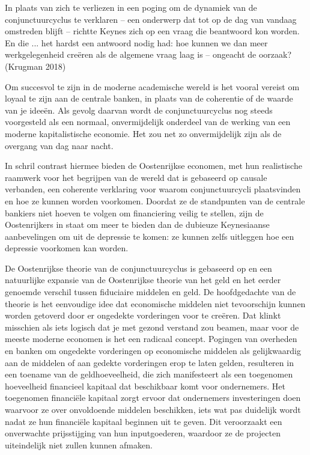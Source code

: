\documentclass[
  a5paper,
  smalldemyvopaper,11pt,twoside,onecolumn,openright,extrafontsizes,
hidelinks]{memoir}
\begin{document}
In plaats van zich te verliezen in een poging om de dynamiek van de
conjunctuurcyclus te verklaren -- een onderwerp dat tot op de dag van
vandaag omstreden blijft -- richtte Keynes zich op een vraag die
beantwoord kon worden. En die ... het hardst een antwoord nodig had: hoe
kunnen we dan meer werkgelegenheid creëren als de algemene vraag laag is
-- ongeacht de oorzaak? (Krugman 2018)

Om succesvol te zijn in de moderne academische wereld is het vooral
vereist om loyaal te zijn aan de centrale banken, in plaats van de
coherentie of de waarde van je ideeën. Als gevolg daarvan wordt de
conjunctuurcyclus nog steeds voorgesteld als een normaal, onvermijdelijk
onderdeel van de werking van een moderne kapitalistische economie. Het
zou net zo onvermijdelijk zijn als de overgang van dag naar nacht.

In schril contrast hiermee bieden de Oostenrijkse economen, met hun
realistische raamwerk voor het begrijpen van de wereld dat is gebaseerd
op causale verbanden, een coherente verklaring voor waarom
conjunctuurcycli plaatsvinden en hoe ze kunnen worden voorkomen. Doordat
ze de standpunten van de centrale bankiers niet hoeven te volgen om
financiering veilig te stellen, zijn de Oostenrijkers in staat om meer
te bieden dan de dubieuze Keynesiaanse aanbevelingen om uit de depressie
te komen: ze kunnen zelfs uitleggen hoe een depressie voorkomen kan
worden.

De Oostenrijkse theorie van de conjunctuurcyclus is gebaseerd op en een
natuurlijke expansie van de Oostenrijkse theorie van het geld en het
eerder genoemde verschil tussen fiduciaire middelen en geld. De
hoofdgedachte van de theorie is het eenvoudige idee dat economische
middelen niet tevoorschijn kunnen worden getoverd door er ongedekte
vorderingen voor te creëren. Dat klinkt misschien als iets logisch dat
je met gezond verstand zou beamen, maar voor de meeste moderne economen
is het een radicaal concept. Pogingen van overheden en banken om
ongedekte vorderingen op economische middelen als gelijkwaardig aan de
middelen of aan gedekte vorderingen erop te laten gelden, resulteren in
een toename van de geldhoeveelheid, die zich manifesteert als een
toegenomen hoeveelheid financieel kapitaal dat beschikbaar komt voor
ondernemers. Het toegenomen financiële kapitaal zorgt ervoor dat
ondernemers investeringen doen waarvoor ze over onvoldoende middelen
beschikken, iets wat pas duidelijk wordt nadat ze hun financiële
kapitaal beginnen uit te geven. Dit veroorzaakt een onverwachte
prijsstijging van hun inputgoederen, waardoor ze de projecten
uiteindelijk niet zullen kunnen afmaken.
\end{document}

